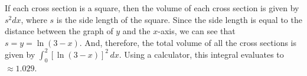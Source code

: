 \begin{Answer}[ref=AP_87]
If each cross section is a square, then the volume of each cross section is 
given by $s^2 dx$, where $s$ is the side length of the square. Since the side 
length is equal to the distance between the graph of $y$ and the $x$-axis, we 
can see that $s = y = \ln{(3 - x)}$. And, therefore, the total volume of all 
the cross sections is given by $\int_0^2 \left[\ln{(3 - x)} \right]^2\,dx$. 
Using a calculator, this integral evaluates to $\approx 1.029$. 
\end{Answer}

